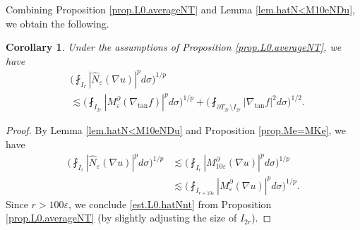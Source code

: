 \documentclass[reqno,12pt]{amsart} %
\newtheorem{proposition}[theorem]{Proposition}
\newtheorem{corollary}[theorem]{Corollary}
\theoremstyle{definition}
\theoremstyle{remark}
\numberwithin{equation}{section}
\newcommand{\cL}{\mathcal{L}}
\newcommand{\e}{\varepsilon}
\begin{document}
Combining Proposition \ref{prop.L0.averageNT} and Lemma \ref{lem.hatN<M10eNDu}, we obtain the following.

\begin{corollary}\label{coro.L0.hatN}
    Under the assumptions of Proposition \ref{prop.L0.averageNT}, we have
    \begin{equation}\label{est.L0.hatNnt}
    \begin{aligned}
        & \bigg( \fint_{I_{r}} | \widehat{N}_\e(\nabla u)|^p d\sigma \bigg)^{1/p} \\
        & \lesssim \bigg( \fint_{I_{2r}} |M_\e^\partial(\nabla_{\tan} f)|^p d\sigma \bigg)^{1/p} + \bigg( \fint_{\partial T_{2r} \setminus I_{2r} } |\nabla_{\tan} f|^2 d\sigma \bigg)^{1/2}.
    \end{aligned}   
    \end{equation}
\end{corollary}

\begin{proof}
    By Lemma \ref{lem.hatN<M10eNDu} and Proposition \ref{prop.Me=MKe}, we have
    \begin{equation}
    \begin{aligned}
        \bigg( \fint_{I_{r}} | \widehat{N}_\e(\nabla u)|^p d\sigma \bigg)^{1/p} & \lesssim \bigg( \fint_{I_{r}} | M_{10\e}^\partial (\nabla u)|^p d\sigma \bigg)^{1/p} \\
        & \lesssim \bigg( \fint_{I_{r+10\e }} | M_{\e}^\partial (\nabla u)|^p d\sigma \bigg)^{1/p}.
    \end{aligned}
    \end{equation}
    Since $r > 100\e$, we conclude \eqref{est.L0.hatNnt} from Proposition \ref{prop.L0.averageNT} (by slightly adjusting the size of $I_{2r}$).
\end{proof}

\end{document}
